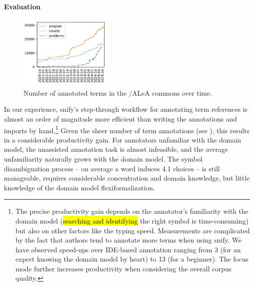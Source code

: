 \documentclass[runningheads]{llncs}
\def\edited#1{\hl{#1}}
\newcommand\ALeA{\textsf{ALeA}\xspace}
\newcommand\snify{\textsf{snify}\xspace}
\begin{document}
\paragraph{Evaluation}
\begin{figure}
    \vskip-1.2cm
  \centering
  \includegraphics[width=0.4\textwidth]{../img/annocounts.pdf}
    \vskip-0.2cm
  \caption{Number of annotated terms in the \sTeX/\ALeA commons over time.}\label{fig:annocounts}
  \vskip-0.7cm
\end{figure}
In our experience, \snify's step-through workflow for annotating term references 
is almost an order of magnitude more efficient than writing the
annotations and imports by hand.\footnote{
        The precise productivity gain depends on the annotator's
        familiarity with the domain model (\edited{searching and identifying}
        the right symbol is time-consuming) but also on other factors like
        the typing speed.
        Measurements are complicated by the fact that
        authors tend to annotate more terms when using \snify.
        We have observed speed-ups over IDE-based annotation
        ranging from 3 (for an expert knowing the domain model by heart)
        to 13 (for a beginner).
        The focus mode further increases productivity
        when considering the overall corpus quality.
}
Given the sheer number of term annotations (see ),
this results in a considerable productivity gain.
For annotators unfamiliar with the domain model, the unassisted annotation task is
almost infeasible, and the average unfamiliarity naturally grows with the domain
model. The symbol disambiguation process -- on average a word induces 4.1 choices
-- is still manageable,
requires considerable concentration and domain knowledge, but little knowledge of the
domain model flexiformalization.
\end{document}
